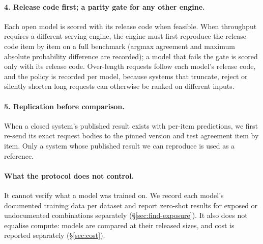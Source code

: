 \paragraph{4. Release code first; a parity gate for any other engine.} Each open model is scored with its release
code when feasible. When throughput requires a different serving engine, the engine must first reproduce the
release code item by item on a full benchmark (argmax agreement and maximum absolute probability difference are
recorded); a model that fails the gate is scored only with its release code. Over-length requests follow each
model's release code, and the policy is recorded per model, because systems that truncate, reject or silently
shorten long requests can otherwise be ranked on different inputs.

\paragraph{5. Replication before comparison.} When a closed system's published result exists with per-item
predictions, we first re-send its exact request bodies to the pinned version and test agreement item by item. Only a
system whose published result we can reproduce is used as a reference.

\paragraph{What the protocol does not control.} It cannot verify what a model was trained on. We record each
model's documented training data per dataset and report zero-shot results for exposed or undocumented combinations
separately (\S\ref{sec:find-exposure}). It also does not equalise compute: models are compared at their released
sizes, and cost is reported separately (\S\ref{sec:cost}).
